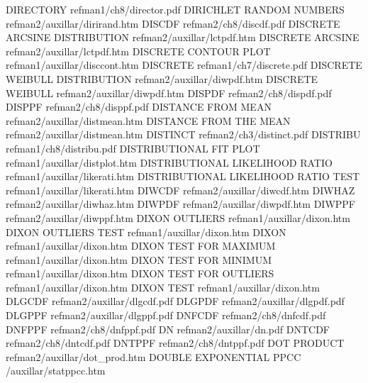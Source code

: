 DIRECTORY                               refman1/ch8/director.pdf
DIRICHLET RANDOM NUMBERS                refman2/auxillar/dirirand.htm
DISCDF                                  refman2/ch8/discdf.pdf
DISCRETE ARCSINE DISTRIBUTION           refman2/auxillar/lctpdf.htm
DISCRETE ARCSINE                        refman2/auxillar/lctpdf.htm
DISCRETE CONTOUR PLOT                   refman1/auxillar/disccont.htm
DISCRETE                                refman1/ch7/discrete.pdf
DISCRETE WEIBULL DISTRIBUTION           refman2/auxillar/diwpdf.htm
DISCRETE WEIBULL                        refman2/auxillar/diwpdf.htm
DISPDF                                  refman2/ch8/dispdf.pdf
DISPPF                                  refman2/ch8/disppf.pdf
DISTANCE FROM MEAN                      refman2/auxillar/distmean.htm
DISTANCE FROM THE MEAN                  refman2/auxillar/distmean.htm
DISTINCT                                refman2/ch3/distinct.pdf
DISTRIBU                                refman1/ch8/distribu.pdf
DISTRIBUTIONAL FIT PLOT                 refman1/auxillar/distplot.htm
DISTRIBUTIONAL LIKELIHOOD RATIO         refman1/auxillar/likerati.htm
DISTRIBUTIONAL LIKELIHOOD RATIO TEST    refman1/auxillar/likerati.htm
DIWCDF                                  refman2/auxillar/diwcdf.htm
DIWHAZ                                  refman2/auxillar/diwhaz.htm
DIWPDF                                  refman2/auxillar/diwpdf.htm
DIWPPF                                  refman2/auxillar/diwppf.htm
DIXON OUTLIERS                          refman1/auxillar/dixon.htm
DIXON OUTLIERS TEST                     refman1/auxillar/dixon.htm
DIXON                                   refman1/auxillar/dixon.htm
DIXON TEST FOR MAXIMUM                  refman1/auxillar/dixon.htm
DIXON TEST FOR MINIMUM                  refman1/auxillar/dixon.htm
DIXON TEST FOR OUTLIERS                 refman1/auxillar/dixon.htm
DIXON TEST                              refman1/auxillar/dixon.htm
DLGCDF                                  refman2/auxillar/dlgcdf.pdf
DLGPDF                                  refman2/auxillar/dlgpdf.pdf
DLGPPF                                  refman2/auxillar/dlgppf.pdf
DNFCDF                                  refman2/ch8/dnfcdf.pdf
DNFPPF                                  refman2/ch8/dnfppf.pdf
DN                                      refman2/auxillar/dn.pdf
DNTCDF                                  refman2/ch8/dntcdf.pdf
DNTPPF                                  refman2/ch8/dntppf.pdf
DOT PRODUCT                             refman2/auxillar/dot_prod.htm
DOUBLE EXPONENTIAL PPCC                 /auxillar/statppcc.htm
